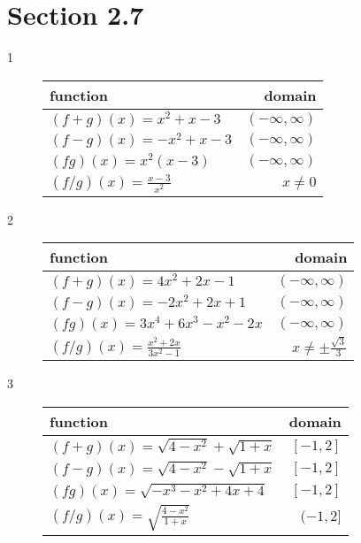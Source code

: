 \documentclass{exam}
\begin{document}
  \pagebreak

  \section{Section 2.7}

  \begin{description}

    \item[1] 
      \begin{tabular}{lr}
        \toprule
        function & domain \\
        \midrule
        $(f + g)(x) = x^2 + x - 3$     & $(-\infty, \infty)$ \\
        \midrule
        $(f - g)(x) = -x^2 + x - 3$    & $(-\infty, \infty)$ \\
        \midrule
        $(fg)(x) = x^2(x - 3)$         & $(-\infty, \infty)$ \\
        \midrule
        $(f/g)(x) = \frac{x - 3}{x^2}$ & $x \neq 0$ \\
        \bottomrule
      \end{tabular}

    \item[2] 
      \begin{tabular}{lr}
        \toprule
        function & domain \\
        \midrule
        $(f + g)(x) = 4x^2 + 2x - 1$       & $(-\infty, \infty)$ \\
        \midrule
        $(f - g)(x) = -2x^2 + 2x + 1$      & $(-\infty, \infty)$ \\
        \midrule
        $(fg)(x) = 3x^4 + 6x^3 - x^2 - 2x$ & $(-\infty, \infty)$ \\
        \midrule
        $(f/g)(x) = \frac{x^2 + 2x}{3x^2 - 1}$ & $x \neq \pm \frac{\sqrt{3}}{3}$ \\
        \bottomrule
      \end{tabular}

    \item[3] 
      \begin{tabular}{lr}
        \toprule
        function & domain \\
        \midrule
        $(f + g)(x) = \sqrt{4 - x^2} + \sqrt{1 + x}$ & $[-1, 2]$ \\
        \midrule
        $(f - g)(x) = \sqrt{4 - x^2} - \sqrt{1 + x}$ & $[-1, 2]$ \\
        \midrule
        $(fg)(x)  = \sqrt{-x^3 - x^2 + 4x + 4}$      & $[-1, 2]$ \\
        \midrule
        $(f/g)(x) = \sqrt{ \frac{4 - x^2}{1 + x} }$  & $(-1, 2]$ \\    
        \bottomrule
      \end{tabular}


\end{description}
\end{document}
